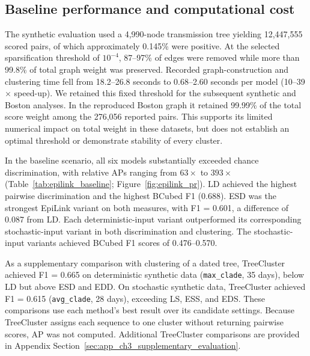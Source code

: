 \subsection{Baseline performance and computational cost}\label{sec:ch3_baseline_performance}

The synthetic evaluation used a 4,990-node transmission tree yielding 12,447,555 scored pairs, of which approximately 0.145\% were positive. At the selected sparsification threshold of $10^{-4}$, 87--97\% of edges were removed while more than 99.8\% of total graph weight was preserved. Recorded graph-construction and clustering time fell from 18.2--26.8 seconds to 0.68--2.60 seconds per model (10--39$\times$ speed-up). We retained this fixed threshold for the subsequent synthetic and Boston analyses. In the reproduced Boston graph it retained 99.99\% of the total score weight among the 276,056 reported pairs. This supports its limited numerical impact on total weight in these datasets, but does not establish an optimal threshold or demonstrate stability of every cluster.

In the baseline scenario, all six models substantially exceeded chance discrimination, with relative APs ranging from $63\times$ to $393\times$ (Table~\ref{tab:epilink_baseline}; Figure~\ref{fig:epilink_pr}). LD achieved the highest pairwise discrimination and the highest BCubed F1 (0.688). ESD was the strongest EpiLink variant on both measures, with F1 = 0.601, a difference of 0.087 from LD. Each deterministic-input variant outperformed its corresponding stochastic-input variant in both discrimination and clustering. The stochastic-input variants achieved BCubed F1 scores of 0.476--0.570.

As a supplementary comparison with clustering of a dated tree, TreeCluster achieved F1 = 0.665 on deterministic synthetic data (\texttt{max\_clade}, 35 days), below LD but above ESD and EDD. On stochastic synthetic data, TreeCluster achieved F1 = 0.615 (\texttt{avg\_clade}, 28 days), exceeding LS, ESS, and EDS. These comparisons use each method's best result over its candidate settings. Because TreeCluster assigns each sequence to one cluster without returning pairwise scores, AP was not computed. Additional TreeCluster comparisons are provided in Appendix Section~\ref{sec:app_ch3_supplementary_evaluation}.

